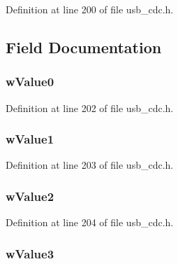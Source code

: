 Definition at line 200 of file usb\-\_\-cdc.\-h.



\subsection{Field Documentation}
\hypertarget{struct_zero___packet___length_a9ec22823f856325394796ecddc8c7cee}{
\subsubsection[{w\-Value0}]{ w\-Value0}}\label{struct_zero___packet___length_a9ec22823f856325394796ecddc8c7cee}


Definition at line 202 of file usb\-\_\-cdc.\-h.

\hypertarget{struct_zero___packet___length_ae02c3c2f43b18232e17336ffe81c72ea}{
\subsubsection[{w\-Value1}]{ w\-Value1}}\label{struct_zero___packet___length_ae02c3c2f43b18232e17336ffe81c72ea}


Definition at line 203 of file usb\-\_\-cdc.\-h.

\hypertarget{struct_zero___packet___length_a2e657f491dc72495d11d149030c53f29}{
\subsubsection[{w\-Value2}]{ w\-Value2}}\label{struct_zero___packet___length_a2e657f491dc72495d11d149030c53f29}


Definition at line 204 of file usb\-\_\-cdc.\-h.

\hypertarget{struct_zero___packet___length_af405b837953c277cf473bd97ced252ac}{
\subsubsection[{w\-Value3}]{ w\-Value3}}\label{struct_zero___packet___length_af405b837953c277cf473bd97ced252ac}


